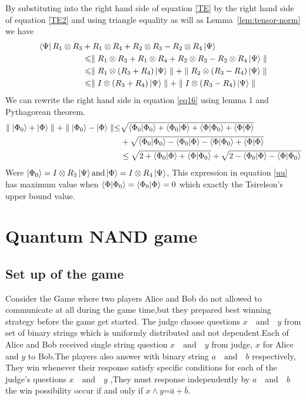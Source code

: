 By substituting into the right hand side of equation \ref{TE} by the right hand side of equation \ref{TE2} and using   triangle equality as will as Lemma~\ref{lem:tensor-norm} we have
\begin{align}
\bra{\Psi}R_1\otimes R_3 &+ R_1\otimes R_4+R_2\otimes R_3 -R_2\otimes R_4\ket{\Psi} \\
&\leqslant  \parallel R_1\otimes R_3+ R_1\otimes R_4+R_2\otimes R_3 -R_2\otimes R_4\ket{\Psi}\parallel \nonumber\\
&\leqslant \parallel R_1\otimes (R_3+ R_4)\ket{\Psi}\parallel +\parallel R_2\otimes( R_3 - R_4)\ket{\Psi}\parallel\nonumber \\
&\leqslant \parallel I\otimes (R_3+ R_4)\ket{\Psi}\parallel +\parallel I\otimes( R_3 - R_4)\ket{\Psi}\parallel\label{eq16}
\end{align}
We can rewrite the right hand side in equation \ref{eq16} using lemma 1 and Pythagorean theorem.
\begin{align}
\parallel \ket{\Phi_0}+ \ket{\Phi}\parallel +\parallel \ket{\Phi_0}- \ket{\Phi}\parallel \leq &\sqrt{\bra{\Phi_0}\ket{\Phi_0}+\bra{\Phi_0}\ket{\Phi}+\bra{\Phi}\ket{\Phi_0}+\bra{\Phi}\ket{\Phi}}\nonumber\\
&+\sqrt{\bra{\Phi_0}\ket{\Phi_0}-\bra{\Phi_0}\ket{\Phi}-\bra{\Phi}\ket{\Phi_0}+\bra{\Phi}\ket{\Phi}}\nonumber\\
 &\leq \sqrt{2+\bra{\Phi_0}\ket{\Phi}+\bra{\Phi}\ket{\Phi_0}}+\sqrt{2-\bra{\Phi_0}\ket{\Phi}-\bra{\Phi}\ket{\Phi_0}}\label{uu}
\end{align}
Were $\ket{\Phi_0}=I\otimes R_3\ket{\Psi} \text{and}\ket{\Phi}=I\otimes R_4\ket{\Psi}$, This expression in equation \ref{uu} has maximum value when $\bra{\Phi}\ket{\Phi_0}=\bra{\Phi_0}\ket{\Phi}=0$ which exactly the Tsirelson’s  upper bound value.

\section{Quantum NAND game}

\subsection{Set up of the game} 
Consider the Game where two players Alice and Bob  do not allowed to  communicate at all during the game time,but they prepared  best winning strategy  before the game get started\citep{ANDJIGA1988189}. The judge choose  questions $x \quad \text{and} \quad y$  from set of binary strings which is uniformly  distributed and not dependent.Each of Alice and Bob received single string question $x \quad \text{and} \quad y$ from  judge, $x$ for Alice and $y$ to Bob.The players also answer with binary string  $a\quad \text{and}\quad  b$ respectively, They win whenever their response satisfy specific conditions for each of the judge's questions $x \quad \text{and} \quad y$ ,They must response independently by  $a \quad \text{and} \quad b$ the win possibility occur  if and only if $x \wedge y$=$\bar{a}+\bar{b}$.
